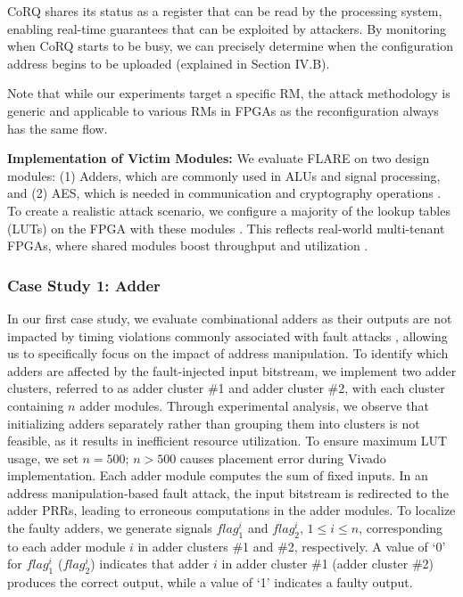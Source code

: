 CoRQ shares its status as a register that can be read by the processing system, enabling real-time guarantees that can be exploited by attackers. By monitoring when CoRQ starts to be busy, we can precisely determine when the configuration address  begins to be uploaded (explained in Section IV.B).

Note that while our experiments target a specific RM, the attack methodology is generic and applicable to various RMs in FPGAs as the reconfiguration always has the same flow.



\textbf{Implementation of Victim Modules:} We evaluate FLARE on two design modules: (1) Adders, which are commonly used in ALUs and signal processing, and (2) AES, which is needed in communication and cryptography operations \cite{krautter2021remote}.  To create a realistic attack scenario, we configure a majority of the lookup tables (LUTs) on the FPGA with these modules \cite{luo2020stealthy}. This reflects real-world multi-tenant FPGAs, where shared modules boost throughput and utilization \cite{mbongue2020architecture}.
\vspace{-0.1cm}
\subsubsection{Case Study 1: Adder}
\vspace{-0.1cm}
In our first case study, we evaluate combinational adders as their outputs are not impacted by timing violations commonly associated with fault attacks \cite{9643485}, allowing us to specifically focus on the impact of address manipulation. To identify which adders are affected by the fault-injected input bitstream, we implement two adder clusters, referred to as adder cluster \#1 and adder cluster \#2, with each cluster containing $n$ adder modules. Through experimental analysis, we observe that initializing adders separately rather than grouping them into clusters is not feasible, as it results in inefficient resource utilization.  To ensure maximum LUT usage, we set $n=500$; $n>500$ causes placement error during Vivado implementation. Each adder module computes the sum of fixed inputs. In an address manipulation-based fault attack, the input bitstream is redirected to the adder PRRs, leading to erroneous computations in the adder modules. To localize the faulty adders, we generate signals $flag_1^i$ and $flag_2^i $, $1 \leq i \leq n$, corresponding to each adder module $i$ in adder clusters \#1 and \#2, respectively. A value of `0' for $flag_1^i$ ($flag_2^i$) indicates that adder $i$ in adder cluster \#1 (adder cluster \#2) produces the correct output, while a value of `1' indicates a faulty output.

